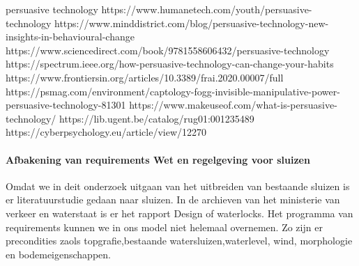 persuasive technology 
https://www.humanetech.com/youth/persuasive-technology 
\cite{humanTechpersuasiveTech}
https://www.minddistrict.com/blog/persuasive-technology-new-insights-in-behavioural-change 
https://www.sciencedirect.com/book/9781558606432/persuasive-technology 
https://spectrum.ieee.org/how-persuasive-technology-can-change-your-habits 
\cite{rezenfeld01012018persuasiveTecgHabits}
https://www.frontiersin.org/articles/10.3389/frai.2020.00007/full 
\cite{aldenaini28042020persuasiveTechTrends}
https://psmag.com/environment/captology-fogg-invisible-manipulative-power-persuasive-technology-81301 
\cite{larson14062017persuasivetechmanipulates}
https://www.makeuseof.com/what-is-persuasive-technology/ 
\cite{tanzem22012022persuasivetechchanginglives}
https://lib.ugent.be/catalog/rug01:001235489 
https://cyberpsychology.eu/article/view/12270 
\cite{tikkakuddonenpersuasiveTechnology}
\paragraph{Afbakening van requirements Wet en regelgeving voor sluizen}
Omdat we in deit onderzoek uitgaan van het uitbreiden van bestaande sluizen is er literatuurstudie gedaan naar sluizen. In de archieven van het ministerie van verkeer en waterstaat is er het rapport Design of waterlocks\cite{CivilEngineeringDivision}.
Het programma van requirements kunnen we in ons model niet helemaal overnemen. 
Zo zijn er precondities zaols topgrafie,bestaande watersluizen,waterlevel, wind, morphologie en bodemeigenschappen.

 

